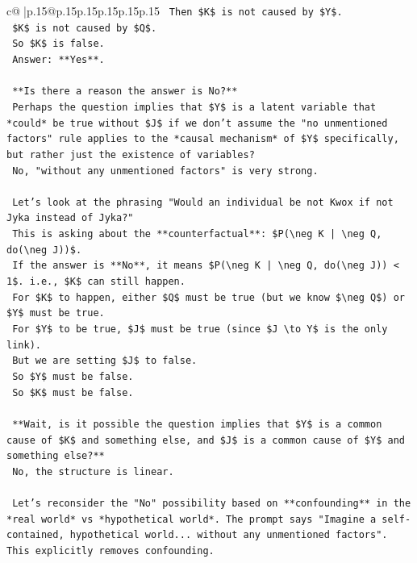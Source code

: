 \documentclass{article}
\begin{document}
{\begin{supertabular}{c@{$\;$}|p{.15\linewidth}@{}p{.15\linewidth}p{.15\linewidth}p{.15\linewidth}p{.15\linewidth}p{.15\linewidth}}
{{{\texttt{        Then \$K\$ is not caused by \$Y\$.} \\
\texttt{        \$K\$ is not caused by \$Q\$.} \\
\texttt{        So \$K\$ is false.} \\
\texttt{        Answer: **Yes**.} \\
\\ 
\texttt{        **Is there a reason the answer is No?**} \\
\texttt{        Perhaps the question implies that \$Y\$ is a latent variable that *could* be true without \$J\$ if we don't assume the "no unmentioned factors" rule applies to the *causal mechanism* of \$Y\$ specifically, but rather just the existence of variables?} \\
\texttt{        No, "without any unmentioned factors" is very strong.} \\
\\ 
\texttt{        Let's look at the phrasing "Would an individual be not Kwox if not Jyka instead of Jyka?"} \\
\texttt{        This is asking about the **counterfactual**: \$P(\textbackslash{}neg K | \textbackslash{}neg Q, do(\textbackslash{}neg J))\$.} \\
\texttt{        If the answer is **No**, it means \$P(\textbackslash{}neg K | \textbackslash{}neg Q, do(\textbackslash{}neg J)) < 1\$. i.e., \$K\$ can still happen.} \\
\texttt{        For \$K\$ to happen, either \$Q\$ must be true (but we know \$\textbackslash{}neg Q\$) or \$Y\$ must be true.} \\
\texttt{        For \$Y\$ to be true, \$J\$ must be true (since \$J \textbackslash{}to Y\$ is the only link).} \\
\texttt{        But we are setting \$J\$ to false.} \\
\texttt{        So \$Y\$ must be false.} \\
\texttt{        So \$K\$ must be false.} \\
\\ 
\texttt{        **Wait, is it possible the question implies that \$Y\$ is a common cause of \$K\$ and something else, and \$J\$ is a common cause of \$Y\$ and something else?**} \\
\texttt{        No, the structure is linear.} \\
\\ 
\texttt{        Let's reconsider the "No" possibility based on **confounding** in the *real world* vs *hypothetical world*. The prompt says "Imagine a self{-}contained, hypothetical world... without any unmentioned factors". This explicitly removes confounding.} \\
}}}
\end{supertabular}}
\end{document}
